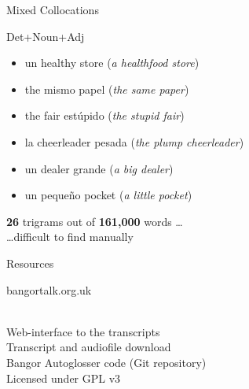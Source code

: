 \documentclass[hyperref={pdfpagelabels=false}, 14pt]{beamer}
\begin{document}
\begin{frame}{Mixed Collocations \\ \begin{normalsize}Det+Noun+Adj\end{normalsize}}
\begin{itemize}
\item un healthy store (\textit{a healthfood store})
\item the mismo papel (\textit{the same paper})
\item the fair estúpido (\textit{the stupid fair})
\item la cheerleader pesada (\textit{the plump cheerleader})
\item un dealer grande (\textit{a big dealer})
\item un pequeño pocket (\textit{a little pocket})
\end{itemize}
\textbf{26} trigrams out of \textbf{161,000} words \dots \\
\hfill \dots difficult to find manually
\end{frame}


\begin{frame}{}
\begin{center}
\begin{huge} \textcolor{ESRCred}{Resources} \end{huge}
\end{center}
\end{frame}


\begin{frame}{}
\begin{center}
\begin{LARGE} \textcolor{ESRCred}{bangortalk.org.uk} \end{LARGE} \\
\bigskip
Web-interface to the transcripts \\
\bigskip
Transcript and audiofile download \\
\bigskip
Bangor Autoglosser code (Git repository) \\
Licensed under GPL v3
\end{center}
\end{frame}
\end{document}

